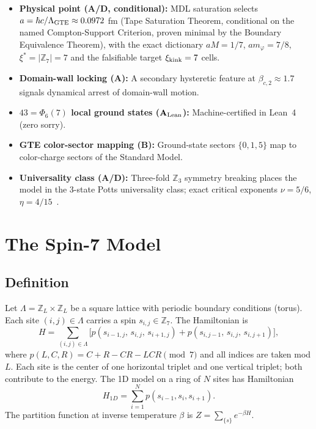 \documentclass[11pt]{article}
\theoremstyle{remark}
\newcommand{\CatA}{\textbf{A}}
\newcommand{\CatAL}{\ensuremath{\textbf{A}_{\rm Lean}}}
\newcommand{\CatAD}{\textbf{A/D}}
\newcommand{\CatB}{\textbf{B}}
\begin{document}
\begin{itemize}[leftmargin=2em,itemsep=2pt,topsep=4pt]
  \item \textbf{Physical point (\CatAD{}, conditional):} MDL saturation
        selects $a = \hbar c/\Lambda_{\rm GTE} \approx 0.0972$ fm (Tape
        Saturation Theorem, conditional on the named Compton-Support
        Criterion, proven minimal by the Boundary Equivalence Theorem), with
        the exact dictionary $aM = 1/7$, $am_\varphi = 7/8$,
        $\xi^* = |\mathbb{Z}_7| = 7$ and the falsifiable target
        $\xi_{\rm kink} = 7$ cells.
  \item \textbf{Domain-wall locking (\CatA{}):} A secondary hysteretic feature
        at $\beta_{c,2} \approx 1.7$ signals dynamical arrest of domain-wall motion.
  \item \textbf{$43 = \Phi_6(7)$ local ground states (\CatAL{}):} Machine-certified
        in Lean~4 (zero sorry).
  \item \textbf{GTE color-sector mapping (\CatB{}):} Ground-state sectors
        $\{0, 1, 5\}$ map to color-charge sectors of the Standard Model.
  \item \textbf{Universality class (\CatAD{}):} Three-fold $\mathbb{Z}_3$
        symmetry breaking places the model in the 3-state Potts universality class;
        exact critical exponents $\nu = 5/6$, $\eta = 4/15$~\cite{Wu1982}.
\end{itemize}

\section{The Spin-7 Model}
\label{sec:model}

\subsection{Definition}

Let $\Lambda = \mathbb{Z}_L \times \mathbb{Z}_L$ be a square lattice with
periodic boundary conditions (torus). Each site $(i,j) \in \Lambda$ carries a
spin $s_{i,j} \in \mathbb{Z}_7$. The Hamiltonian is
\begin{equation}\label{eq:H2D}
  H = \sum_{(i,j) \in \Lambda} \bigl[
    p(s_{i-1,j},\, s_{i,j},\, s_{i+1,j}) + p(s_{i,j-1},\, s_{i,j},\, s_{i,j+1})
  \bigr],
\end{equation}
where $p(L,C,R) = C + R - CR - LCR \pmod 7$ and all indices are taken mod $L$.
Each site is the center of one horizontal triplet and one vertical triplet; both
contribute to the energy. The 1D model on a ring of $N$ sites has Hamiltonian
\begin{equation}\label{eq:H1D}
  H_{1D} = \sum_{i=1}^{N} p(s_{i-1}, s_i, s_{i+1}).
\end{equation}
The partition function at inverse temperature $\beta$ is $Z = \sum_{\{s\}} e^{-\beta H}$.
\end{document}
